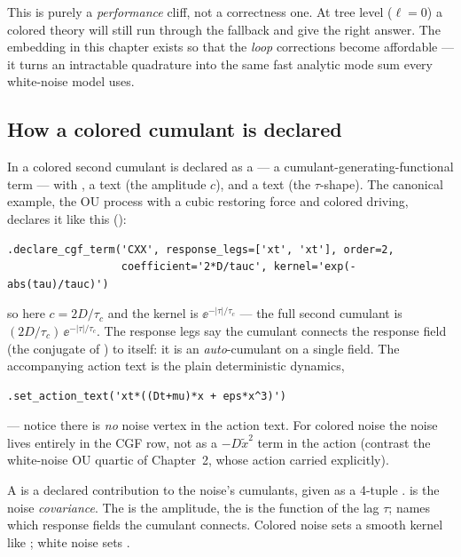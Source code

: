 \begin{note}
This is purely a \emph{performance} cliff, not a correctness one. At tree level
($\ell = 0$) a colored theory will still run through the  fallback
and give the right answer. The embedding in this chapter exists so that the
\emph{loop} corrections become affordable --- it turns an intractable
quadrature into the same fast analytic mode sum every white-noise model uses.
\end{note}

\subsection{How a colored cumulant is declared}

In \Daedalus{} a colored second cumulant is declared as a  ---
a cumulant-generating-functional term --- with , a
 text (the amplitude $c$), and a  text (the
$\tau$-shape). The canonical example, the OU process with a cubic restoring force
and colored driving, declares it like this
():

\begin{lstlisting}
.declare_cgf_term('CXX', response_legs=['xt', 'xt'], order=2,
                  coefficient='2*D/tauc', kernel='exp(-abs(tau)/tauc)')
\end{lstlisting}

so here $c = 2D/\tau_c$ and the kernel is $\ee^{-|\tau|/\tau_c}$ --- the full
second cumulant is $(2D/\tau_c)\,\ee^{-|\tau|/\tau_c}$. The response legs
\code{['xt', 'xt']} say the cumulant connects the response field 
(the \msrjd{} conjugate of ) to itself: it is an \emph{auto}-cumulant
on a single field. The accompanying action text is the plain deterministic
dynamics,
\begin{lstlisting}
.set_action_text('xt*((Dt+mu)*x + eps*x^3)')
\end{lstlisting}
--- notice there is \emph{no} noise vertex in the action text. For colored noise
the noise lives entirely in the CGF row, not as a $-D\tilde x^2$ term in the
action (contrast the white-noise OU quartic of Chapter~2, whose action carried
 explicitly).

\begin{defn}
A  is a declared contribution to the noise's cumulants, given as a
4-tuple .  is the
noise \emph{covariance}. The  is the amplitude, the
 is the function of the lag $\tau$;  names which
response fields the cumulant connects. Colored noise sets a smooth kernel like
; white noise sets .
\end{defn}

